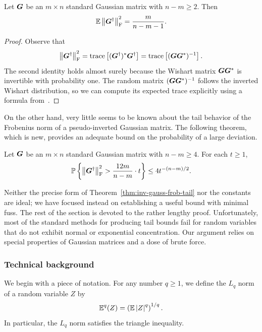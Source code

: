 \documentclass[final]{siamltex}
\begin{document}
\begin{appendix}
\lsp

\begin{proposition} \label{prop:inv-gauss-frob-expect}
Let $\mtx{G}$ be an $m \times n$ standard Gaussian matrix with $n - m \geq 2$.  Then
$$
\Expect \fnormsq{\mtx{G}^\psinv}
    = \frac{m}{n-m-1}.
$$
\end{proposition}

\begin{proof}
Observe that
$$
\smnorm{\rm F}{ \mtx{G}^\psinv }^2
    = \trace \left[ (\mtx{G}^\psinv)^\adj \mtx{G}^\psinv  \right]
    = \trace \left[ (\mtx{GG}^\adj)^{-1} \right].
$$
The second identity holds almost surely because the Wishart matrix $\mtx{GG}^\adj$ is invertible with probability one.
The random matrix $(\mtx{GG}^\adj)^{-1}$ follows the inverted
Wishart distribution, so we can compute its expected trace explicitly
using a formula from~\cite[p.~97]{Mui82:Aspects-Multivariate}.
\end{proof}

\lsp

On the other hand, very little seems to be known about the tail
behavior of the Frobenius norm of a pseudo-inverted Gaussian matrix.
The following theorem, which is new, provides an adequate bound on
the probability of a large deviation.

\lsp

\begin{theorem} \label{thm:inv-gauss-frob-tail}
Let $\mtx{G}$ be an $m \times n$ standard Gaussian matrix with $n - m \geq 4$.
For each $t \geq 1$,
$$
\Prob{ \fnormsq{\mtx{G}^\psinv} > \frac{12 m}{n-m} \cdot t }
    \leq 4 t^{-(n-m)/2}.
$$
\end{theorem}

Neither the precise form of Theorem~\ref{thm:inv-gauss-frob-tail}
nor the constants are ideal;
we have focused instead on establishing a useful bound with minimal fuss.
The rest of the section is devoted to the rather lengthy proof.
Unfortunately, most of the standard methods for producing tail bounds fail
for random variables that do not exhibit normal or exponential concentration.
Our argument relies on special properties of Gaussian matrices and a
dose of brute force.

\subsubsection{Technical background}

We begin with a piece of notation.  For any number $q \geq 1$, we define the $L_q$ norm of
a random variable $Z$ by
$$
\Expect^q(Z) = \left( \Expect \abs{Z}^q \right)^{1/q}.
$$
In particular, the $L_q$ norm satisfies the triangle inequality.


\end{appendix}
\end{document}

